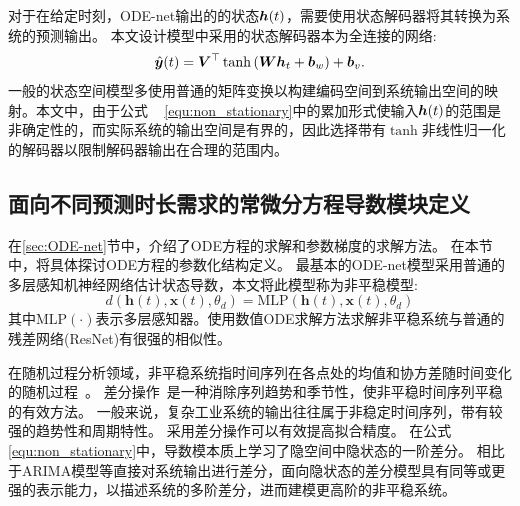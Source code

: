对于在给定时刻，ODE-net输出的的状态$\boldsymbol h(t)$，需要使用状态解码器将其转换为系统的预测输出。
本文设计模型中采用的状态解码器本为全连接的网络:
\begin{equation}
    \hat{\boldsymbol y}(t) = \boldsymbol{V}^{\top} \tanh \left(\boldsymbol{W}\boldsymbol{h}_{t}+\boldsymbol{b}_{w}\right)+\boldsymbol b_{v}.
\end{equation}
一般的状态空间模型多使用普通的矩阵变换以构建编码空间到系统输出空间的映射。本文中，由于公式
~ \eqref{equ:non_stationary}中的累加形式使输入$\boldsymbol h(t)$的范围是非确定性的，而实际系统的输出空间是有界的，因此选择带有$\tanh$非线性归一化的解码器以限制解码器输出在合理的范围内。



\subsection{面向不同预测时长需求的常微分方程导数模块定义}
\label{sec:derivative}
在\ref{sec:ODE-net}节中，介绍了ODE方程的求解和参数梯度的求解方法。
在本节中，将具体探讨ODE方程的参数化结构定义。
最基本的ODE-net模型采用普通的多层感知机神经网络估计状态导数\cite{chen2018neural}，本文将此模型称为非平稳模型:
\begin{equation}
\label{equ:non_stationary}
d\left(\boldsymbol{h}(t), \boldsymbol{x}(t), \theta_{d}\right)=\text{MLP}\left(\boldsymbol{h}(t), \boldsymbol{x}(t), \theta_{d}\right)
\end{equation}
其中$\text{MLP}(\cdot)$表示多层感知器。使用数值ODE求解方法求解非平稳系统与普通的残差网络(ResNet)有很强的相似性。

在随机过程分析领域，非平稳系统指时间序列在各点处的均值和协方差随时间变化的随机过程~\cite{GUIDOLIN2018113}。
差分操作~\cite{christoffersen2001forecasting}是一种消除序列趋势和季节性，使非平稳时间序列平稳的有效方法。
一般来说，复杂工业系统的输出往往属于非稳定时间序列，带有较强的趋势性和周期特性。
采用差分操作可以有效提高拟合精度。
在公式\eqref{equ:non_stationary}中，导数模本质上学习了隐空间中隐状态的一阶差分。
相比于ARIMA模型等直接对系统输出进行差分，面向隐状态的差分模型具有同等或更强的表示能力，以描述系统的多阶差分，进而建模更高阶的非平稳系统。

